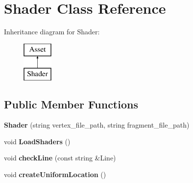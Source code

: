 \hypertarget{class_shader}{}\section{Shader Class Reference}
\label{class_shader}
Inheritance diagram for Shader\+:\begin{figure}[H]
\begin{center}
\leavevmode
\includegraphics[height=2.000000cm]{class_shader}
\end{center}
\end{figure}
\subsection*{Public Member Functions}
\begin{DoxyCompactItemize}
\item 
\hypertarget{class_shader_a71fc7c649e38febf8bb7b595855fd631}{}{\bfseries Shader} (string vertex\+\_\+file\+\_\+path, string fragment\+\_\+file\+\_\+path)\label{class_shader_a71fc7c649e38febf8bb7b595855fd631}

\item 
\hypertarget{class_shader_a44ff58703bdc37626f73051ad06650fd}{}void {\bfseries Load\+Shaders} ()\label{class_shader_a44ff58703bdc37626f73051ad06650fd}

\item 
\hypertarget{class_shader_a06e03a6849c1729778b71ffaf0f4f743}{}void {\bfseries check\+Line} (const string \&Line)\label{class_shader_a06e03a6849c1729778b71ffaf0f4f743}

\item 
\hypertarget{class_shader_a46bff156441ba67d54d7487317deb71b}{}void {\bfseries create\+Uniform\+Location} ()\label{class_shader_a46bff156441ba67d54d7487317deb71b}

\end{DoxyCompactItemize}
